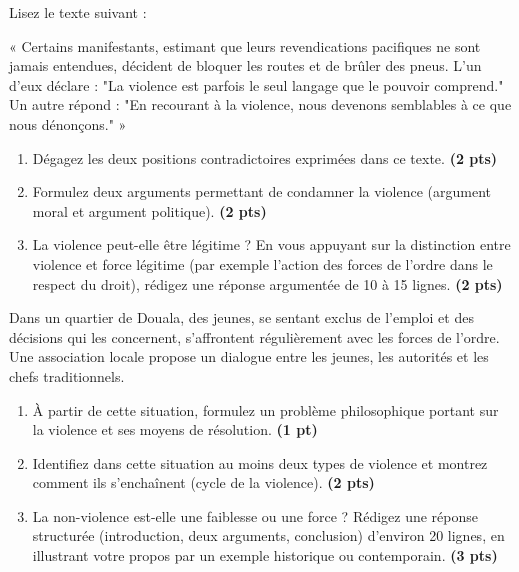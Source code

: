 \documentclass[11pt]{article}
\begin{document}
\begin{exercice}
Lisez le texte suivant :

« Certains manifestants, estimant que leurs revendications pacifiques ne sont jamais entendues, décident de bloquer les routes et de brûler des pneus. L'un d'eux déclare : "La violence est parfois le seul langage que le pouvoir comprend." Un autre répond : "En recourant à la violence, nous devenons semblables à ce que nous dénonçons." »

\begin{enumerate}
\item Dégagez les deux positions contradictoires exprimées dans ce texte. \textbf{(2 pts)}
\item Formulez deux arguments permettant de condamner la violence (argument moral et argument politique). \textbf{(2 pts)}
\item La violence peut-elle être légitime ? En vous appuyant sur la distinction entre violence et force légitime (par exemple l'action des forces de l'ordre dans le respect du droit), rédigez une réponse argumentée de 10 à 15 lignes. \textbf{(2 pts)}
\end{enumerate}
\end{exercice}

\begin{exercice}
Dans un quartier de Douala, des jeunes, se sentant exclus de l'emploi et des décisions qui les concernent, s'affrontent régulièrement avec les forces de l'ordre. Une association locale propose un dialogue entre les jeunes, les autorités et les chefs traditionnels.
\begin{enumerate}
\item À partir de cette situation, formulez un problème philosophique portant sur la violence et ses moyens de résolution. \textbf{(1 pt)}
\item Identifiez dans cette situation au moins deux types de violence et montrez comment ils s'enchaînent (cycle de la violence). \textbf{(2 pts)}
\item La non-violence est-elle une faiblesse ou une force ? Rédigez une réponse structurée (introduction, deux arguments, conclusion) d'environ 20 lignes, en illustrant votre propos par un exemple historique ou contemporain. \textbf{(3 pts)}
\end{enumerate}
\end{exercice}
\end{document}
